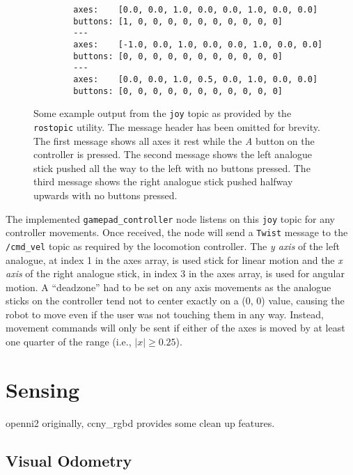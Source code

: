 \begin{figure}[!h]
	\centering
	\begin{lstlisting}
		axes:    [0.0, 0.0, 1.0, 0.0, 0.0, 1.0, 0.0, 0.0]
		buttons: [1, 0, 0, 0, 0, 0, 0, 0, 0, 0, 0]
		---
		axes:    [-1.0, 0.0, 1.0, 0.0, 0.0, 1.0, 0.0, 0.0]
		buttons: [0, 0, 0, 0, 0, 0, 0, 0, 0, 0, 0]
		---
		axes:    [0.0, 0.0, 1.0, 0.5, 0.0, 1.0, 0.0, 0.0]
		buttons: [0, 0, 0, 0, 0, 0, 0, 0, 0, 0, 0]
	\end{lstlisting}
	\caption{Some example output from the \texttt{joy} topic as provided by the \texttt{rostopic} utility. The message header has been omitted for brevity. The first message shows all axes it rest while the \emph{A} button on the controller is pressed. The second message shows the left analogue stick pushed all the way to the left with no buttons pressed. The third message shows the right analogue stick pushed halfway upwards with no buttons pressed.}
	\label{fig:joy_example}
\end{figure}

The implemented \texttt{gamepad\_controller} node listens on this \texttt{joy} topic for any controller movements. Once received, the node will send a \texttt{Twist} message to the \texttt{/cmd\_vel} topic as required by the locomotion controller. The \emph{y axis} of the left analogue, at index 1 in the axes array, is used stick for linear motion and the \emph{x axis} of the right analogue stick, in index 3 in the axes array, is used for angular motion. A ``deadzone'' had to be set on any axis movements as the analogue sticks on the controller tend not to center exactly on a (0, 0) value, causing the robot to move even if the user was not touching them in any way. Instead, movement commands will only be sent if either of the axes is moved by at least one quarter of the range (i.e., $|x| \geq 0.25$).


\section{Sensing}

openni2 originally, ccny\_rgbd \cite{ccny_rgbd} provides some clean up features.

\subsection{Visual Odometry}


